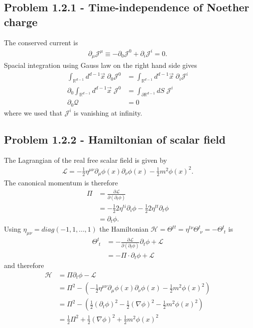 \documentclass[10pt,a4paper]{book}
\theoremstyle{definition}
\begin{document}
\subsection{Problem 1.2.1 - Time-independence of Noether charge}
The conserved current is
\begin{align}
    \partial_\mu\mathcal{J}^\mu\equiv-\partial_0\mathcal{J}^0+\partial_i\mathcal{J}^i=0.
\end{align}
Spacial integration using Gauss law on the right hand side gives
\begin{align}
    \int_{\mathbb{R}^{d-1}} d^{d-1}\vec{x}\;\partial_0\mathcal{J}^0&=\int_{\mathbb{R}^{d-1}} d^{d-1}\vec{x}\;\partial_i\mathcal{J}^i\\
    \partial_0\int_{\mathbb{R}^{d-1}} d^{d-1}\vec{x}\;\mathcal{J}^0&=\int_{\partial\mathbb{R}^{d-1}} dS\;\mathcal{J}^i\\
    \partial_0\mathcal{Q}&=0
\end{align}
where we used that $\mathcal{J}^i$ is vanishing at infinity.

\subsection{Problem 1.2.2 - Hamiltonian of scalar field}
The Lagrangian of the real free scalar field is given by 
\begin{align}
    \mathcal{L}=-\frac{1}{2}\eta^{\mu\nu}\partial_\mu\phi(x)\partial_\nu\phi(x)-\frac{1}{2}m^2\phi(x)^2.
\end{align}
The canonical momentum is therefore
\begin{align}
    \Pi &= \frac{\partial\mathcal{L}}{\partial(\partial_t\phi)}\\
    &=-\frac{1}{2}2\eta^{ti}\partial_i\phi -\frac{1}{2}2\eta^{tt}\partial_t\phi\\
    &=\partial_t\phi.
\end{align}
Using $\eta_{\mu\nu}=diag(-1,1,...,1)$ the Hamiltonian $\mathcal{H}=\Theta^{tt}=\eta^{t\nu}\Theta^t_{\;\nu}=-\Theta^t_{\;t}$ is 
\begin{align}
    \Theta^t_{\;t}
    &=-\frac{\partial\mathcal{L}}{\partial(\partial_t\phi)}\partial_t\phi+\mathcal{L}\\
    &=-\Pi\cdot\partial_t\phi+\mathcal{L}
\end{align}
and therefore
\begin{align}
    \mathcal{H}&=\Pi\partial_t\phi-\mathcal{L}\\
    &=\Pi^2-\left(-\frac{1}{2}\eta^{\mu\nu}\partial_\mu\phi(x)\partial_\nu\phi(x)-\frac{1}{2}m^2\phi(x)^2\right)\\
    &=\Pi^2-\left(\frac{1}{2}(\partial_t\phi)^2-\frac{1}{2}(\nabla\phi)^2-\frac{1}{2}m^2\phi(x)^2\right)\\
    &=\frac{1}{2}\Pi^2+\frac{1}{2}(\nabla\phi)^2+\frac{1}{2}m^2\phi(x)^2
\end{align}
\end{document}
